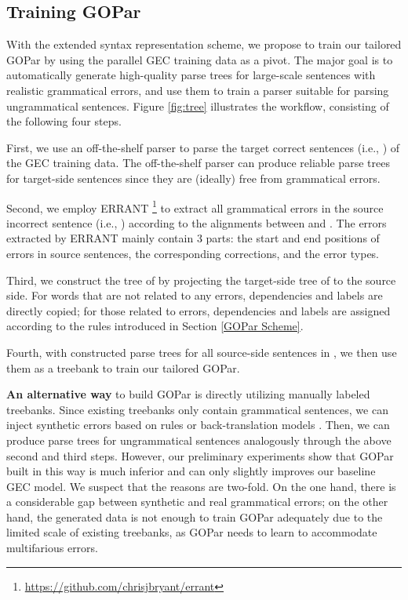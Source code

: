 \documentclass[11pt]{article}
\begin{document}
\subsection{Training GOPar} \label{GOPar Data}  

With the extended syntax representation scheme, we propose to train our tailored GOPar by using the parallel GEC training data  as a pivot. 
The major goal is to automatically generate high-quality parse trees for large-scale sentences with realistic grammatical errors, and use them to train a parser suitable for parsing ungrammatical sentences. 
Figure \ref{fig:tree} illustrates the workflow, consisting of the following four steps. 



First, we use an off-the-shelf parser to parse the target correct sentences (i.e., ) of the GEC training data. The off-the-shelf parser can produce reliable parse trees for target-side sentences since they are (ideally) free from grammatical errors.

Second, we employ ERRANT \citep{bryant2017automatic}\footnote{\url{https://github.com/chrisjbryant/errant}} 
to extract all grammatical errors in the source incorrect sentence (i.e., ) according to the alignments  between  and . The errors extracted by ERRANT mainly contain 3 parts: the start and end positions of errors in source sentences, the corresponding corrections, and the error types.


Third, we construct the tree of  by projecting the target-side tree of  to the source side. For words that are not related to any errors, dependencies and labels are directly copied; for those related to errors,  dependencies and labels are assigned according to the rules introduced in Section \ref{GOPar Scheme}. 



Fourth,  with constructed parse trees for all source-side sentences in ,  we then use them as a treebank to train our tailored GOPar. 




\textbf{An alternative way} to build  GOPar is directly utilizing manually labeled treebanks. 
Since existing treebanks only contain grammatical sentences, we can inject synthetic errors based on rules or back-translation models \citep{foster2008adapting,cahill2015parsing}. 
Then, we can produce parse trees for ungrammatical sentences analogously through the above second and third steps. 
However, our preliminary experiments show that GOPar built in this way is much inferior and can only 
slightly improves our baseline GEC model.  
We suspect that the reasons are two-fold. On the one hand, there is a considerable gap between synthetic and real grammatical errors; on the other hand, the generated data is not enough to train GOPar adequately due to the limited scale of existing treebanks, as GOPar needs to learn to accommodate multifarious errors.
\end{document}
